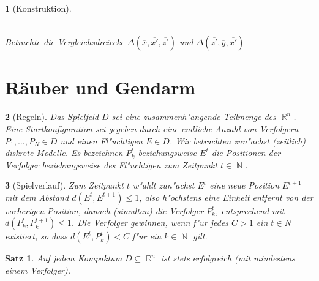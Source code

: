 \documentclass[paper=A4, twoside, chapterprefix=true, bibliography=totoc, headsepline]{scrbook}
\DeclareMathOperator{\N}{\mathbb{N}}
\DeclareMathOperator{\R}{\mathbb{R}}
\newcommand{\kapit}[1]{\textsc{#1}\xspace} %
\newcommand{\Greedy}{\kapit{Greedy}}
\theoremstyle{nonumberbreak}
\newtheorem{satz}{Satz}
\theoremstyle{emptybreak}
\newtheorem{emptythm}{}%
\theoremstyle{break}
\newcommand{\quot}[1]{\text{\glqq}{#1}\text{\grqq}}
\begin{document}
\begin{emptythm}[Konstruktion]
\begin{center}
\\
Betrachte die Vergleichsdreiecke $\Delta(\overline x, \overline{x'}, \overline{z'})$ und $\Delta(\overline{z'}, \overline{y}, \overline{x'})$
\end{center}
\end{emptythm}

\section{R\"auber und Gendarm}

\begin{emptythm}[Regeln]
Das Spielfeld $D$ sei eine zusammenh"angende Teilmenge des $\R^n$.
Eine Startkonfiguration sei gegeben durch eine endliche Anzahl von Verfolgern $P_1, \ldots, P_N \in D$ und einen Fl"uchtigen $E \in D$.
Wir betrachten zun"achst (zeitlich) diskrete Modelle.
Es bezeichnen $P_k^t$ beziehungsweise $E^t$ die Positionen der Verfolger beziehungsweise des Fl"uchtigen zum Zeitpunkt $t \in \N$.
\end{emptythm}

\begin{emptythm}[Spielverlauf]
Zum Zeitpunkt $t$ w"ahlt zun"achst $E^t$ eine neue Position $E^{t+1}$ mit dem Abstand $d(E^t, E^{t+1}) \le 1$, also h"ochstens eine Einheit entfernt von der vorherigen Position, danach (simultan) die Verfolger $P_k^t$, entsprechend mit $d(P_k^t, P_k^{t+1}) \le 1$.
Die Verfolger gewinnen, wenn f"ur jedes $C > 1$ ein $t \in N$ existiert, so dass $d(E^t, P_k^t) < C$ f"ur ein $k \in \N$ gilt.
\end{emptythm}

\begin{satz}
Auf jedem Kompaktum $D \subseteq \R^n$ ist \quot{\index{Greedy@\Greedy}\Greedy} stets erfolgreich (mit mindestens einem Verfolger).
\end{satz}
\end{document}
